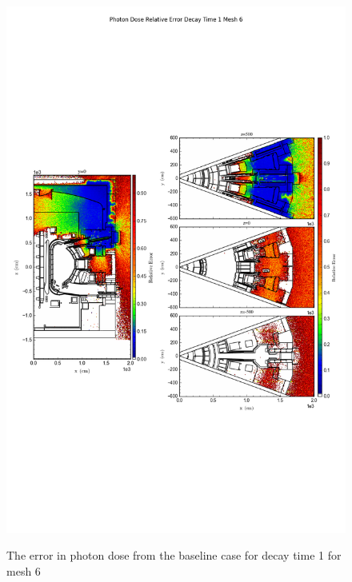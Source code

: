 \begin{figure}[ht!]
\centering
\includegraphics[trim={0cm 9cm 0cm 10cm},clip,scale=0.75]{../plots/final_model/Photon_Dose_Relative_Error_Decay_Time_1_Mesh_6.png}
\label{fig:photons_dc1_no4bc_m6_error}
\caption{The error in photon dose from the baseline case for decay time 1 for mesh 6}
\end{figure}
